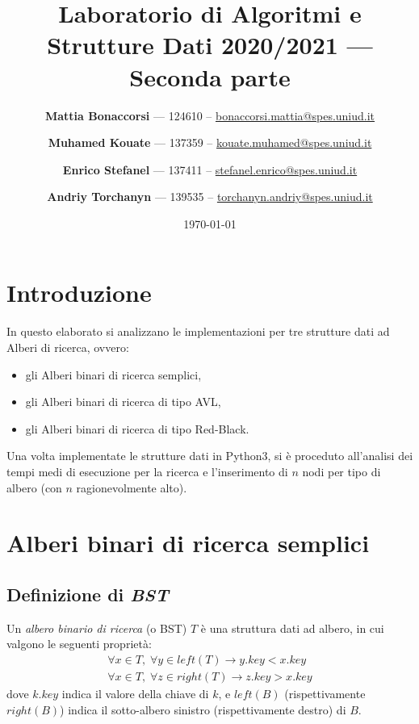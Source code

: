 \documentclass[11pt,a4paper,italian]{article}
\title{\textbf{Laboratorio di Algoritmi e Strutture Dati 2020/2021} --- Seconda parte}
\date{\today}
\author{\textbf{Mattia Bonaccorsi} --- 124610 -- \href{mailto:bonaccorsi.mattia@spes.uniud.it}{bonaccorsi.mattia@spes.uniud.it}
   \and \textbf{Muhamed Kouate} --- 137359 -- \href{mailto:kouate.muhamed@spes.uniud.it}{kouate.muhamed@spes.uniud.it}
   \and \textbf{Enrico Stefanel} --- 137411 -- \href{mailto:stefanel.enrico@spes.uniud.it}{stefanel.enrico@spes.uniud.it}
   \and \textbf{Andriy Torchanyn} --- 139535 -- \href{mailto:torchanyn.andriy@spes.uniud.it}{torchanyn.andriy@spes.uniud.it}
   }
\begin{document}



\maketitle
\tableofcontents


\clearpage

\section{Introduzione}
In questo elaborato si analizzano le implementazioni per tre strutture dati ad Alberi di ricerca, ovvero:
\begin{itemize}
	\item gli Alberi binari di ricerca semplici,
	\item gli Alberi binari di ricerca di tipo AVL,
	\item gli Alberi binari di ricerca di tipo Red-Black.
\end{itemize} 
Una volta implementate le strutture dati in Python3, si è proceduto all'analisi dei tempi medi di esecuzione per la ricerca e l'inserimento di $n$ nodi per tipo di albero (con $n$ ragionevolmente alto).

\section{Alberi binari di ricerca semplici}

\subsection{Definizione di \textit{BST}}  
Un \textit{albero binario di ricerca} (o BST) $T$ è una struttura dati ad albero, in cui valgono le seguenti proprietà:
\begin{equation}
\begin{split}
	\forall x \in T,\; \forall y \in left(T) \rightarrow y.key < x.key	 \\
	\forall x \in T,\; \forall z \in right(T) \rightarrow z.key > x.key
\end{split}  \tag{$\star$}
\end{equation}
dove $k.key$ indica il valore della chiave di $k$, e $left(B)$ (rispettivamente $right(B)$) indica il sotto-albero sinistro (rispettivamente destro) di $B$.
\\
\end{document}
